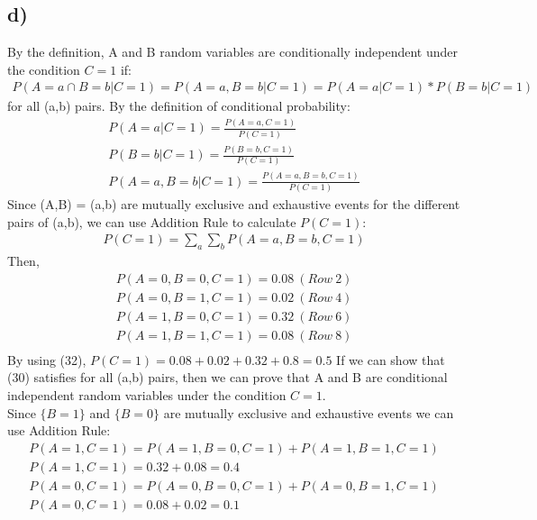\documentclass[12pt]{article}
\begin{document}
\subsection*{d)} By the definition, A and B random variables are conditionally independent under the condition $C=1$ if:
\begin{equation} 
\begin{split}
P(A=a \cap B=b|C=1) = P(A=a,B=b|C=1) = P(A=a|C=1)*P(B=b|C=1)
\end{split}
\end{equation}
for all (a,b) pairs. By the definition of conditional probability:
\begin{equation} 
\begin{split}
P(A=a|C=1) = \frac{P(A=a,C=1)}{P(C=1)} \\
P(B=b|C=1) = \frac{P(B=b,C=1)}{P(C=1)} \\
P(A=a,B=b|C=1) = \frac{P(A=a,B=b,C=1)}{P(C=1)}
\end{split}
\end{equation}
Since {(A,B) = (a,b)} are mutually exclusive and exhaustive events for the different pairs of (a,b), we can use Addition Rule to calculate $P(C=1)$:
\begin{equation} 
\begin{split}
P(C=1) = \sum_{a}\sum_{b}P(A=a,B=b,C=1)
\end{split}
\end{equation}
Then,
\begin{equation} 
\begin{split}
P(A=0,B=0,C=1) = 0.08 \ (Row \ 2) \\
P(A=0,B=1,C=1) = 0.02 \ (Row \ 4) \\
P(A=1,B=0,C=1) = 0.32 \ (Row \ 6) \\
P(A=1,B=1,C=1) = 0.08 \ (Row \ 8) \\
\end{split}
\end{equation}
By using (32), $P(C=1) = 0.08+ 0.02 + 0.32 + 0.8 = 0.5$
If we can show that (30) satisfies for all (a,b) pairs, then we can prove that A and B are conditional independent random variables under the condition $C=1$. \\
Since $\{B=1\}$ and $\{B=0\}$ are mutually exclusive and exhaustive events we can use Addition Rule:
\begin{equation} 
\begin{split}
P(A=1,C=1) = P(A=1,B=0,C=1) + P(A=1,B=1,C=1) \\
P(A=1,C=1) = 0.32 + 0.08 = 0.4 \\
P(A=0,C=1) = P(A=0,B=0,C=1) + P(A=0,B=1,C=1) \\
P(A=0,C=1) = 0.08 + 0.02 = 0.1
\end{split}
\end{equation}
\end{document}
